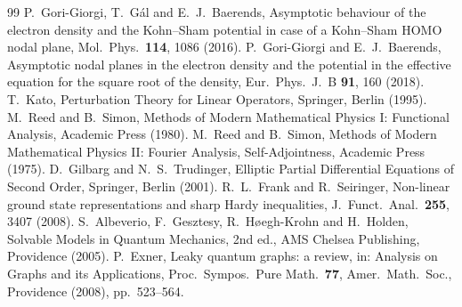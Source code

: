 \documentclass[11pt,a4paper]{article}
\theoremstyle{plain}
\theoremstyle{definition}
\theoremstyle{remark}
\begin{document}
\begin{thebibliography}{99}
 P.~Gori-Giorgi, T.~G\'al and E.~J.~Baerends, Asymptotic behaviour of the electron density and the Kohn--Sham potential in case of a Kohn--Sham HOMO nodal plane, Mol.\ Phys.\ \textbf{114}, 1086 (2016).
 P.~Gori-Giorgi and E.~J.~Baerends, Asymptotic nodal planes in the electron density and the potential in the effective equation for the square root of the density, Eur.\ Phys.\ J.\ B \textbf{91}, 160 (2018).
 T.~Kato, Perturbation Theory for Linear Operators, Springer, Berlin (1995).
 M.~Reed and B.~Simon, Methods of Modern Mathematical Physics I: Functional Analysis, Academic Press (1980).
 M.~Reed and B.~Simon, Methods of Modern Mathematical Physics II: Fourier Analysis, Self-Adjointness, Academic Press (1975).
 D.~Gilbarg and N.~S.~Trudinger, Elliptic Partial Differential Equations of Second Order, Springer, Berlin (2001).
 R.~L.~Frank and R.~Seiringer, Non-linear ground state representations and sharp Hardy inequalities, J.\ Funct.\ Anal.\ \textbf{255}, 3407 (2008).
 S.~Albeverio, F.~Gesztesy, R.~H\o egh-Krohn and H.~Holden, Solvable Models in Quantum Mechanics, 2nd ed., AMS Chelsea Publishing, Providence (2005).
 P.~Exner, Leaky quantum graphs: a review, in: Analysis on Graphs and its Applications, Proc.\ Sympos.\ Pure Math.\ \textbf{77}, Amer.\ Math.\ Soc., Providence (2008), pp.~523--564.
\end{thebibliography}
\end{document}
